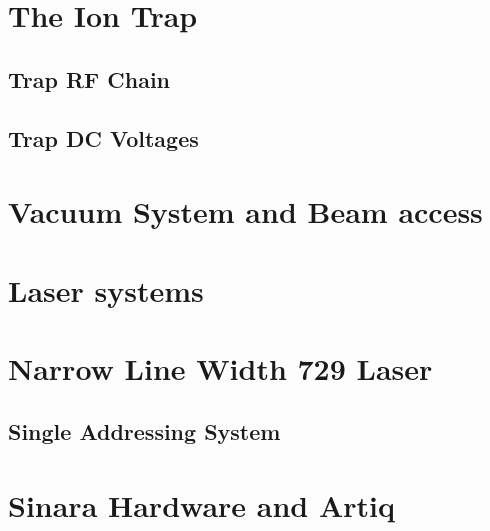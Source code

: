 \documentclass[12pt]{report}
\begin{document}
\section{The Ion Trap}
\label{sec:The Ion Trap}

\subsection{Trap RF Chain}
\subsection{Trap DC Voltages}

\section{Vacuum System and Beam access}
\label{sec:Vacuum System}

\section{Laser systems}
\label{sec:Laser systems}


\section{Narrow Line Width 729 Laser}
\label{sec:Narrow Line Width 729 Laser} 


\subsection{Single Addressing System}
\label{sec:Single Addressing System}

\section{Sinara Hardware and Artiq}
\label{sec:Sinara Hardware}

\end{document}

